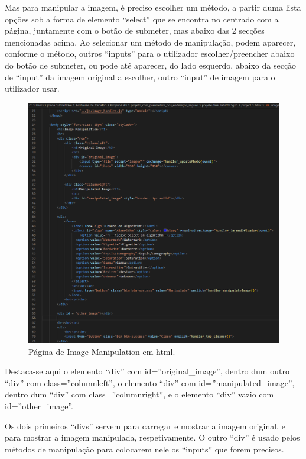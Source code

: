 \documentclass{report}
\begin{document}
 \linebreak
 \bigskip

	Mas para manipular a imagem, é preciso escolher um método, a partir duma lista opções sob a forma de elemento “select” que se encontra no centrado com a página, juntamente com o botão de submeter, mas abaixo das 2 secções mencionadas acima. Ao selecionar um método de manipulação, podem aparecer, conforme o método, outros “inputs” para o utilizador escolher/preencher abaixo do botão de submeter, ou pode até aparecer, do lado esquerdo, abaixo da secção de “input” da imagem original a escolher, outro “input” de imagem para o utilizador usar.

 \newpage
 \begin{figure}[!hbtp]
        \centering
        \includegraphics[scale=0.53]{Images_code/12 - image manipulation html.png}
        \caption{\label{Estrutura}Página de Image Manipulation em html.}
\end{figure}

 
Destaca-se aqui o elemento “div” com id=”original\_image”, dentro dum outro “div” com class=”columnleft”, o elemento “div” com id=”manipulated\_image”, dentro dum “div” com class=”columnright”,  e o elemento “div” vazio com id=”other\_image”.

\linebreak
 \bigskip
 
	Os dois primeiros “divs” servem para carregar e mostrar a imagem original, e para mostrar a imagem manipulada, respetivamente. O outro “div” é usado pelos métodos de manipulação para colocarem nele os “inputs” que forem precisos.
\end{document}
